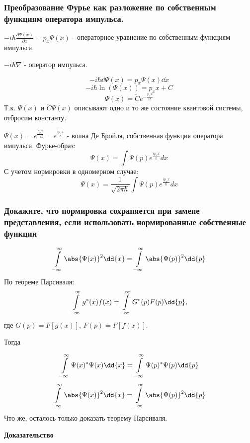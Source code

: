 \subsubsection{Преобразование Фурье как разложение по собственным функциям оператора импульса.}

$-i\hbar \frac{\partial{\Psi(x)}}{\partial x}=p_x \Psi(x)$ - операторное уравнение по собственным функциям импульса.

$-i\hbar \nabla$ - оператор импульса.

$$-i\hbar \dd \Psi(x)=p_x \Psi(x)\dd x$$
$$-i\hbar \ln(\Psi(x))=p_xx +C$$
$$\Psi(x)=\widetilde{C} e^{-\frac{p_xx}{i\hbar}}$$
Т.к. $\Psi(x)$ и $\widetilde{C} \Psi(x)$ описывают одно и то же состояние квантовой системы, отбросим константу. 

$\Psi(x)=e^{\frac{p_xx}{-i\hbar}}=e^{\frac{ip_xx}{\hbar}}$ - волна Де Бройля, собственная функция оператора импульса. Фурье-образ:
$$\Psi(x)=\int \Psi(p) e^{\frac{ip_xx}{\hbar}} dx$$
 С учетом нормировки в одномерном случае:
 $$\Psi(x)=\frac{1}{\sqrt{2\pi \hbar}}\int \Psi(p) e^{\frac{ip_xx}{\hbar}} dx$$

\subsubsection{Докажите, что нормировка сохраняется при замене представления, если использовать нормированные собственные функции }

$$\infint \abs{\Psi(x)}^2 \dd{x} = \infint \abs{\Psi(p)}^2 \dd{p}$$
По теореме Парсиваля:
$$\infint g^*(x) f(x)=\infint G^*(p) F(p) \dd{p}, $$
где $G(p)=F[g(x)]$, $F(p)=F[f(x)]$.

Тогда

$$\infint \Psi(x)^*\Psi(x) \dd{x} = \infint \Psi(p)^*\Psi(p) \dd{p} $$
$$\infint \abs{\Psi(x)}^2 \dd{x} = \infint \abs{\Psi(p)}^2\dd{p}  $$
Что же, осталось только доказать теорему Парсиваля.

{\centering\textbf{Доказательство} \\}

